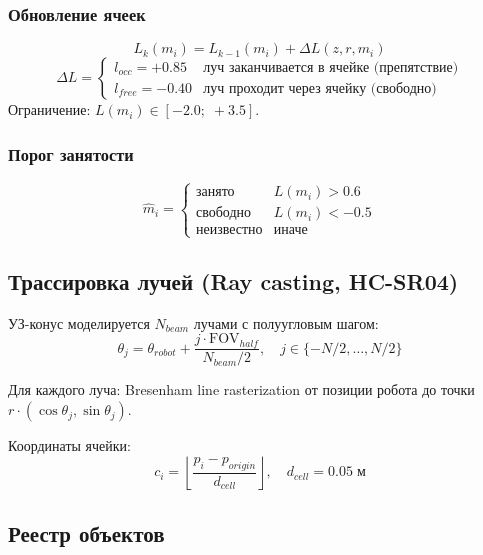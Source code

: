 \documentclass[12pt, a4paper]{article}
\begin{document}
\subsubsection{Обновление ячеек}
\begin{equation}
  L_k(m_i) = L_{k-1}(m_i) + \Delta L(z, r, m_i)
\end{equation}
\begin{equation}
  \Delta L =
  \begin{cases}
    l_{occ}  = +0.85  & \text{луч заканчивается в ячейке (препятствие)} \\
    l_{free} = -0.40  & \text{луч проходит через ячейку (свободно)}
  \end{cases}
\end{equation}
Ограничение: $L(m_i) \in [-2.0;\; +3.5]$.

\subsubsection{Порог занятости}
\begin{equation}
  \hat{m}_i =
  \begin{cases}
    \text{занято}  & L(m_i) > 0.6 \\
    \text{свободно} & L(m_i) < -0.5 \\
    \text{неизвестно} & \text{иначе}
  \end{cases}
\end{equation}

\subsection{Трассировка лучей (Ray casting, HC-SR04)}

УЗ-конус моделируется $N_{beam}$ лучами с полуугловым шагом:
\begin{equation}
  \theta_j = \theta_{robot} + \frac{j\cdot\text{FOV}_{half}}{N_{beam}/2}, \quad
  j \in \{-N/2, \ldots, N/2\}
\end{equation}

Для каждого луча: Bresenham line rasterization от позиции робота до точки $r\cdot(\cos\theta_j, \sin\theta_j)$.

Координаты ячейки:
\begin{equation}
  c_i = \left\lfloor\frac{p_i - p_{origin}}{d_{cell}}\right\rfloor, \quad d_{cell} = 0.05\;\text{м}
\end{equation}

\subsection{Реестр объектов}
\end{document}
